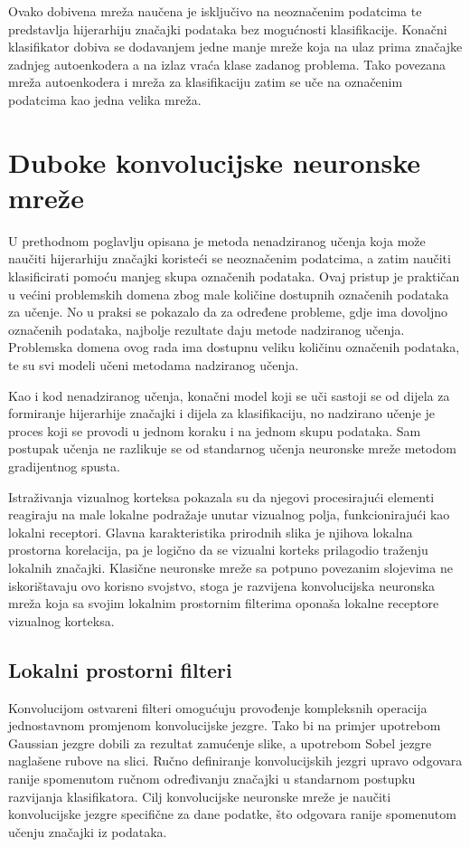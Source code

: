 \documentclass[lmodern, utf8, diplomski, numeric]{fer}
\begin{document}
Ovako dobivena mreža naučena je isključivo na neoznačenim podatcima te predstavlja hijerarhiju značajki podataka bez mogućnosti klasifikacije. Konačni klasifikator dobiva se dodavanjem jedne manje mreže koja na ulaz prima značajke zadnjeg autoenkodera a na izlaz vraća klase zadanog problema. Tako povezana mreža autoenkodera i mreža za klasifikaciju zatim se uče na označenim podatcima kao jedna velika mreža.


\chapter{Duboke konvolucijske neuronske mreže}

U prethodnom poglavlju opisana je metoda nenadziranog učenja koja može naučiti hijerarhiju značajki koristeći se neoznačenim podatcima, a zatim naučiti klasificirati pomoću manjeg skupa označenih podataka. Ovaj pristup je praktičan u većini problemskih domena zbog male količine dostupnih označenih podataka za učenje. No u praksi se pokazalo da za određene probleme, gdje ima dovoljno označenih podataka, najbolje rezultate daju metode nadziranog učenja. Problemska domena ovog rada ima dostupnu veliku količinu označenih podataka, te su svi modeli učeni metodama nadziranog učenja.

Kao i kod nenadziranog učenja, konačni model koji se uči sastoji se od dijela za formiranje hijerarhije značajki i dijela za klasifikaciju, no nadzirano učenje je proces koji se provodi u jednom koraku i na jednom skupu podataka. Sam postupak učenja ne razlikuje se od standarnog učenja neuronske mreže metodom gradijentnog spusta.

Istraživanja vizualnog korteksa pokazala su da njegovi procesirajući elementi reagiraju na male lokalne podražaje unutar vizualnog polja, funkcionirajući kao lokalni receptori. Glavna karakteristika prirodnih slika je njihova lokalna prostorna korelacija, pa je logično da se vizualni korteks prilagodio traženju lokalnih značajki.
Klasične neuronske mreže sa potpuno povezanim slojevima ne iskorištavaju ovo korisno svojstvo, stoga je razvijena konvolucijska neuronska mreža koja sa svojim lokalnim prostornim filterima oponaša lokalne receptore vizualnog korteksa.

\section{Lokalni prostorni filteri}

Konvolucijom ostvareni filteri omogućuju provođenje kompleksnih operacija jednostavnom promjenom konvolucijske jezgre. Tako bi na primjer upotrebom Gaussian jezgre dobili za rezultat zamućenje slike, a upotrebom Sobel jezgre naglašene rubove na slici. Ručno definiranje konvolucijskih jezgri upravo odgovara ranije spomenutom ručnom određivanju značajki u standarnom postupku razvijanja klasifikatora. Cilj konvolucijske neuronske mreže je naučiti konvolucijske jezgre specifične za dane podatke, što odgovara ranije spomenutom učenju značajki iz podataka.
\end{document}
